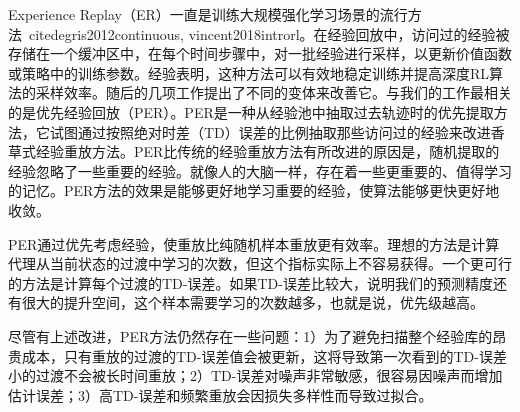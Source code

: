 Experience Replay（ER）\cite{lin1992self}一直是训练大规模强化学习场景的流行方法~cite{degris2012continuous, vincent2018introrl}。在经验回放中，访问过的经验被存储在一个缓冲区中，在每个时间步骤中，对一批经验进行采样，以更新价值函数或策略中的训练参数。经验表明，这种方法可以有效地稳定训练并提高深度RL算法的采样效率。随后的几项工作提出了不同的变体来改善它\cite{schaul2016prioritized,junhyuk2018selfil,horgan2018distributed,Sun2020er}。与我们的工作最相关的是优先经验回放（PER）\cite{schaul2016prioritized}。PER是一种从经验池中抽取过去轨迹时的优先提取方法，它试图通过按照绝对时差（TD）误差的比例抽取那些访问过的经验来改进香草式经验重放方法。PER比传统的经验重放方法有所改进的原因是，随机提取的经验忽略了一些重要的经验。就像人的大脑一样，存在着一些更重要的、值得学习的记忆。PER方法的效果是能够更好地学习重要的经验，使算法能够更快更好地收敛。


PER通过优先考虑经验，使重放比纯随机样本重放更有效率。理想的方法是计算代理从当前状态的过渡中学习的次数，但这个指标实际上不容易获得。一个更可行的方法是计算每个过渡的TD-误差。如果TD-误差比较大，说明我们的预测精度还有很大的提升空间，这个样本需要学习的次数越多，也就是说，优先级越高。


尽管有上述改进，PER方法仍然存在一些问题：1）为了避免扫描整个经验库的昂贵成本，只有重放的过渡的TD-误差值会被更新，这将导致第一次看到的TD-误差小的过渡不会被长时间重放；2）TD-误差对噪声非常敏感，很容易因噪声而增加估计误差；3）高TD-误差和频繁重放会因损失多样性而导致过拟合。

